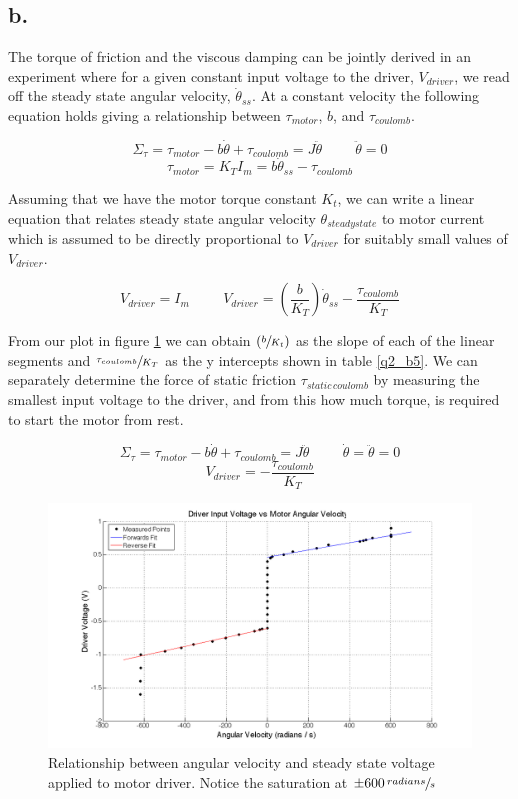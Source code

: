 \documentclass{article}
\theoremstyle{plain}
\theoremstyle{definition}
\theoremstyle{remark}
\begin{document}
\subsection*{b.}

The torque of friction and the viscous damping can be jointly  derived in an experiment where for a given constant input voltage to the driver, $V_{driver}$, we read off the steady state angular velocity, $\dot{\theta}_{ss}$.  At a constant velocity the following equation holds giving a relationship between $\tau_{motor}$, $b$, and $\tau_{coulomb}$.

$$\Sigma_{\tau} =  \tau_{motor} - b\dot{\theta} + \tau_{coulomb} = J \ddot{\theta} \hspace{1cm} \ddot{\theta} = 0 $$
$$ \tau_{motor} = K_{T}I_{m} = b\dot{\theta}_{ss} - \tau_{coulomb}$$

Assuming that we have the motor torque constant $K_{t}$, we can write a linear equation that relates steady state angular velocity $\theta_{steady state}$ to motor current which is assumed to be directly proportional to $V_{driver}$ for suitably small values of $V_{driver}$.

$$ V_{driver} = I_{m} \hspace{1cm} V_{driver} = \left( \frac{b}{K_T} \right) \dot{\theta}_{ss} - \frac{\tau_{coulomb}}{K_{T}} $$

From our plot in figure \ref{q2_b4} we can obtain $\left( \sfrac{b}{K_t} \right)$ as the slope of each of the linear segments and $\sfrac{\tau_{coulomb}}{K_{T}}$ as the y intercepts shown in table \ref{q2_b5}.  We can separately determine the force of static friction $\tau_{static \, coulomb}$ by measuring the smallest input voltage to the driver, and from this how much torque, is required to start the motor from rest.

$$ \Sigma_{\tau} =  \tau_{motor} - b\dot{\theta} + \tau_{coulomb} = J \ddot{\theta} \hspace{1cm} \dot{\theta} = \ddot{\theta} = 0 $$
$$ V_{driver} = - \frac{\tau_{coulomb}}{K_{T}} $$

\begin{figure}[htb]
\begin{center}
\includegraphics[width = 16cm]{SpeedCurrentCurve.png}
\caption{Relationship between angular velocity and steady state voltage applied to motor driver.  Notice the saturation at $\pm 600 \, \sfrac{radians}{s}$}
\label{q2_b4}
\end{center}
\end{figure}
\end{document}
